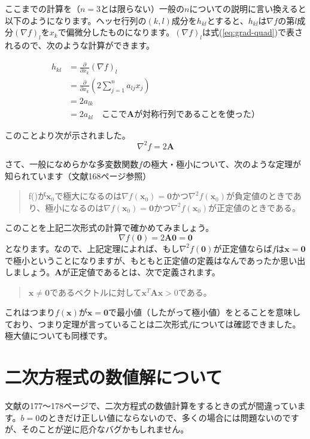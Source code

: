 \documentclass[11pt]{article}
\begin{document}
ここまでの計算を（$n=3$とは限らない）一般の$n$についての説明に言い換えると以下のようになります。ヘッセ行列の$(k,l)$成分を$h_{kl}$とすると、$h_{kl}$は$\nabla f$の第$l$成分$(\nabla f)_l$を$x_k$で偏微分したものになります。$(\nabla f)_l$は式(\ref{eq:grad-quad})で表されるので、次のような計算ができます。

\begin{align*}
  h_{kl}&=\frac{\partial}{\partial x_k} (\nabla f)_l\\
  &=\frac{\partial }{\partial x_k} \left(2\sum_{j=1}^n a_{lj} x_j \right)\\
  &=2a_{lk}\\
  &=2a_{kl} \quad\text{ここで$\bm{A}$が対称行列であることを使った）}
\end{align*}

このことより次が示されました。
\[
\nabla^2 f = 2\bm{A}
\]

さて、一般になめらかな多変数関数$f$の極大・極小について、次のような定理が知られています（文献\cite{mle}168ページ参照）

\begin{quote}
  f()が$\bm{x}_0$で極大になるのは$\nabla f(\bm{x}_0)=\bm{0}$かつ$\nabla^2 f(\bm{x}_0)$が負定値のときであり、極小になるのは$\nabla f(\bm{x}_0)=\bm{0}$かつ$\nabla^2 f(\bm{x}_0)$が正定値のときである。
\end{quote}

このことを上記二次形式の計算で確かめてみましょう。
\[
\nabla f(\bm{0})=2\bm{A}\bm{0} = \bm{0}
\]
となります。なので、上記定理によれば、もし$\nabla^2 f(\bm{0})$が正定値ならば$f$は$\bm{x}=\bm{0}$で極小ということになりますが、もともと正定値の定義はなんであったか思い出しましょう。$\bm{A}$が正定値であるとは、次で定義されます。

\begin{quote}
  $\bm{x}\neq \bm{0}$であるベクトルに対して$\bm{x}^T \bm{A} \bm{x}>0$である。
\end{quote}

これはつまり$f(\bm{x})$が$\bm{x}=\bm{0}$で最小値（したがって極小値）をとることを意味しており、つまり定理が言っていることは二次形式$f$については確認できました。極大値についても同様です。

\section{二次方程式の数値解について}
文献\cite{mle}の177〜178ページで、二次方程式の数値計算をするときの式が間違っています。$b=0$のときだけ正しい値にならないので、多くの場合には問題ないのですが、そのことが逆に厄介なバグかもしれません。
\end{document}
